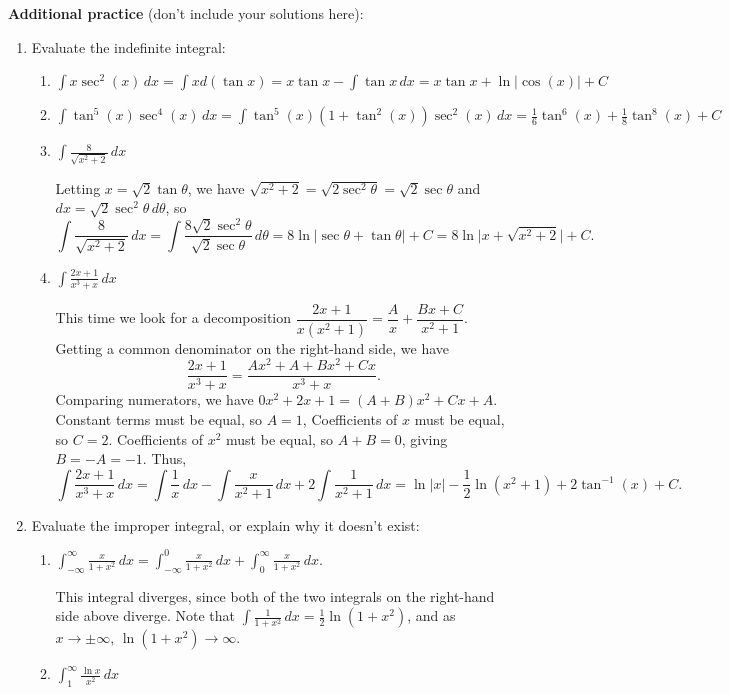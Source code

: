 \documentclass[12pt]{article}
\newcommand{\di}{\displaystyle}
\newcommand{\abs}[1]{\lvert #1\rvert}
\begin{document}
\textbf{Additional practice} (don't include your solutions here):
\begin{enumerate}
\item Evaluate the indefinite integral:

\begin{enumerate}
 \item $\di \int x\sec^2(x)\,dx = \int x d(\tan x) = x\tan x-\int \tan x\,dx = x\tan x+\ln\abs{\cos(x)}+C$
 \item $\di \int \tan^5(x)\sec^4(x)\,dx = \int \tan^5(x)(1+\tan^2(x))\sec^2(x)\,dx = \frac{1}{6}\tan^6(x)+\frac{1}{8}\tan^8(x)+C$
 \item $\di \int \frac{8}{\sqrt{x^2+2}}\,dx$
 
 \medskip

Letting $x=\sqrt{2}\tan\theta$, we have $\sqrt{x^2+2} = \sqrt{2\sec^2\theta} = \sqrt{2}\sec\theta$ and $dx = \sqrt{2}\sec^2\theta\,d\theta$, so
\[
 \int\frac{8}{\sqrt{x^2+2}}\,dx = \int \frac{8\sqrt{2}\sec^2\theta}{\sqrt{2}\sec\theta}\,d\theta = 8\ln\abs{\sec\theta+\tan\theta}+C = 8\ln\abs{x+\sqrt{x^2+2}}+C.
\]
 \item $\di \int \frac{2x+1}{x^3+x}\,dx$
 
 This time we look for a decomposition $\dfrac{2x+1}{x(x^2+1)} = \dfrac{A}{x}+\dfrac{Bx+C}{x^2+1}$. Getting a common denominator on the right-hand side, we have
\[
 \frac{2x+1}{x^3+x} = \frac{Ax^2+A+Bx^2+Cx}{x^3+x}.
\]
Comparing numerators, we have $0x^2+2x+1 = (A+B)x^2+Cx+A$. Constant terms must be equal, so $A=1$, Coefficients of $x$ must be equal, so $C=2$. Coefficients of $x^2$ must be equal, so $A+B=0$, giving $B=-A=-1$. Thus,
\[
 \int\frac{2x+1}{x^3+x}\,dx = \int \frac{1}{x}\,dx -\int\frac{x}{x^2+1}\,dx + 2\int \frac{1}{x^2+1}\,dx = \ln\abs{x}-\frac{1}{2}\ln(x^2+1)+2\tan^{-1}(x)+C.
\]
\end{enumerate}

\item Evaluate the improper integral, or explain why it doesn't exist:

\begin{enumerate}
 \item $\di \int_{-\infty}^\infty \frac{x}{1+x^2}\,dx = \int_{-\infty}^0 \frac{x}{1+x^2}\,dx + \int_0^\infty\frac{x}{1+x^2}\,dx$.

This integral diverges, since both of the two integrals on the right-hand side above diverge. Note that $\di \int\frac{1}{1+x^2}\,dx = \frac{1}{2}\ln(1+x^2)$, and as $x\to \pm\infty$, $\ln(1+x^2)\to\infty$.


 \item $\di \int_1^\infty\frac{\ln x}{x^2}\,dx$
 

\end{enumerate}
\end{enumerate}
\end{document}
